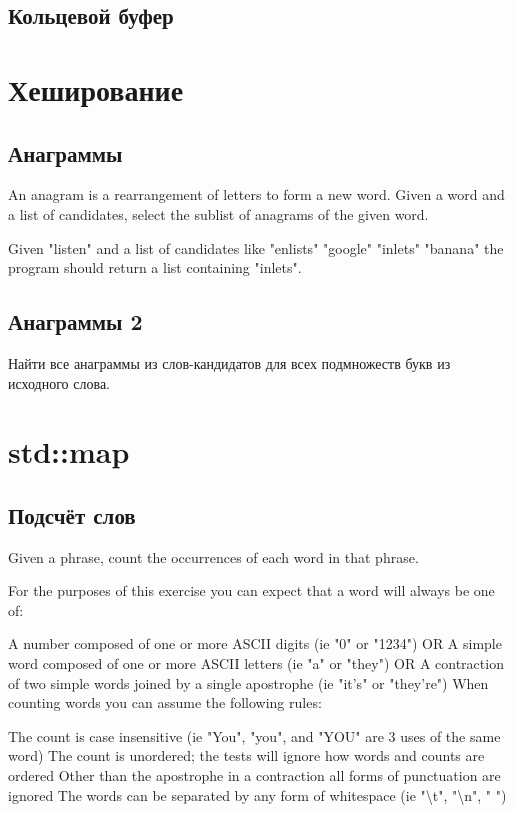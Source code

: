 \documentclass[10pt,twoside,openany]{book}
\begin{document}
\section{Кольцевой буфер}

\chapter{Хеширование}

\section{Анаграммы}

An anagram is a rearrangement of letters to form a new word.
Given a word and a list of candidates, select the sublist of anagrams of the given word.

Given "listen" and a list of candidates like "enlists" "google" "inlets" "banana"
the program should return a list containing "inlets".

\section{Анаграммы 2}

Найти все анаграммы из слов-кандидатов для всех подмножеств букв из исходного слова.

\chapter{std::map}

\section{Подсчёт слов}

Given a phrase, count the occurrences of each word in that phrase.

For the purposes of this exercise you can expect that a word will always be one of:

A number composed of one or more ASCII digits (ie "0" or "1234") OR
A simple word composed of one or more ASCII letters (ie "a" or "they") OR
A contraction of two simple words joined by a single apostrophe (ie "it's" or "they're")
When counting words you can assume the following rules:

The count is case insensitive (ie "You", "you", and "YOU" are 3 uses of the same word)
The count is unordered; the tests will ignore how words and counts are ordered
Other than the apostrophe in a contraction all forms of punctuation are ignored
The words can be separated by any form of whitespace (ie "\textbackslash t", "\textbackslash n", " ")
\end{document}
